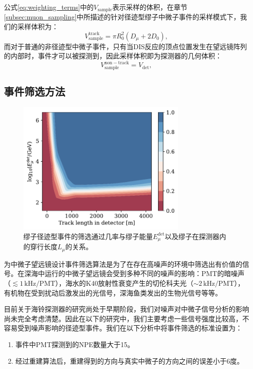 公式\ref{eq:weighting_terms}中的$V_\mathrm{sample}$表示采样的体积，在章节\ref{subsec:muon_sampling}中所描述的针对径迹型缪子中微子事件的采样模式下，我们的采样体积为：
\begin{equation}
    V_\mathrm{sample}^\mathrm{track} = \pi R_0^2 (D_\mu + 2D_0) ,
    \label{eq:weighting_volume}
\end{equation}
而对于普通的非径迹型中微子事件，只有当DIS反应的顶点位置发生在望远镜阵列的内部时，事件才可以被探测到，因此采样体积即为探测器的几何体积：
\begin{equation}
    V_\mathrm{sample}^\mathrm{non-track} = V_\mathrm{det} ,
    \label{eq:weighting_volume_2}
\end{equation}

\subsection{事件筛选方法}

\begin{figure}[!htb]%
    \centering
    \includegraphics[width=0.75\textwidth]{img/trigger_rate_nn.pdf}
    \caption{缪子径迹型事件的筛选通过几率与缪子能量$E_\mu^\mathrm{det}$以及缪子在探测器内的穿行长度$L_\mu$的关系。}
    \label{fig:trigger_rate_nn}
\end{figure}

为中微子望远镜设计事件筛选算法是为了在存在高噪声的环境中筛选出有价值的信号。在深海中运行的中微子望远镜会受到多种不同的噪声的影响：PMT的暗噪声（$\lesssim 1 \,\mathrm{kHz} / \mathrm{PMT}$），海水的K40放射性衰变产生的切伦科夫光（$\sim 2 \,\mathrm{kHz} / \mathrm{PMT}$），有机物在受到扰动后激发出的光信号，深海鱼类发出的生物光信号等等。

目前关于海铃探测器的研究尚处于早期阶段，我们对噪声对中微子信号分析的影响尚未完全考虑清楚。因此在以下的研究中，我们主要考虑一些信号强度比较高，不容易受到噪声影响的径迹型事件。我们在以下分析中将事件筛选的标准设置为：
\begin{enumerate}
    \item 事件中PMT探测到的NPE数量大于15。
    \item 经过重建算法后，重建得到的方向与真实中微子的方向之间的误差小于6度。
\end{enumerate}

